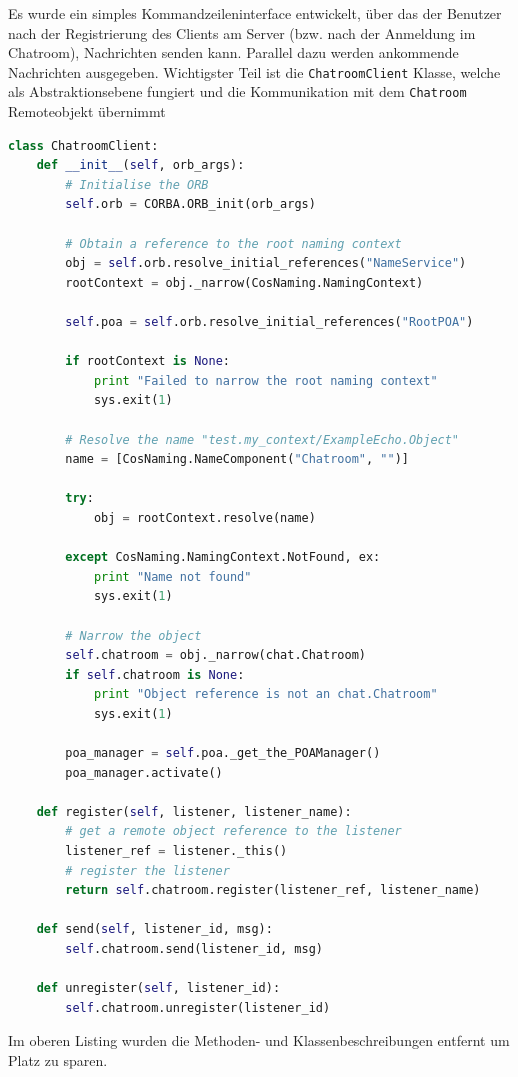 Es wurde ein simples Kommandzeileninterface entwickelt, \"uber das der Benutzer nach der Registrierung des Clients am Server (bzw. nach der Anmeldung im Chatroom), Nachrichten senden kann.
Parallel dazu werden ankommende Nachrichten ausgegeben.
Wichtigster Teil ist die \texttt{ChatroomClient} Klasse, welche als Abstraktionsebene fungiert und die Kommunikation mit dem \texttt{Chatroom} Remoteobjekt \"ubernimmt
\begin{lstlisting}[language={Python}, caption=Chatroom Klasse des Clients als Abstraktionsebene zu CORBA]
class ChatroomClient:
    def __init__(self, orb_args):
        # Initialise the ORB
        self.orb = CORBA.ORB_init(orb_args)

        # Obtain a reference to the root naming context
        obj = self.orb.resolve_initial_references("NameService")
        rootContext = obj._narrow(CosNaming.NamingContext)

        self.poa = self.orb.resolve_initial_references("RootPOA")

        if rootContext is None:
            print "Failed to narrow the root naming context"
            sys.exit(1)

        # Resolve the name "test.my_context/ExampleEcho.Object"
        name = [CosNaming.NameComponent("Chatroom", "")]

        try:
            obj = rootContext.resolve(name)

        except CosNaming.NamingContext.NotFound, ex:
            print "Name not found"
            sys.exit(1)

        # Narrow the object
        self.chatroom = obj._narrow(chat.Chatroom)
        if self.chatroom is None:
            print "Object reference is not an chat.Chatroom"
            sys.exit(1)

        poa_manager = self.poa._get_the_POAManager()
        poa_manager.activate()

    def register(self, listener, listener_name):
        # get a remote object reference to the listener
        listener_ref = listener._this()
        # register the listener
        return self.chatroom.register(listener_ref, listener_name)

    def send(self, listener_id, msg):
        self.chatroom.send(listener_id, msg)

    def unregister(self, listener_id):
        self.chatroom.unregister(listener_id)
\end{lstlisting}
Im oberen Listing wurden die Methoden- und Klassenbeschreibungen entfernt um Platz zu sparen.
